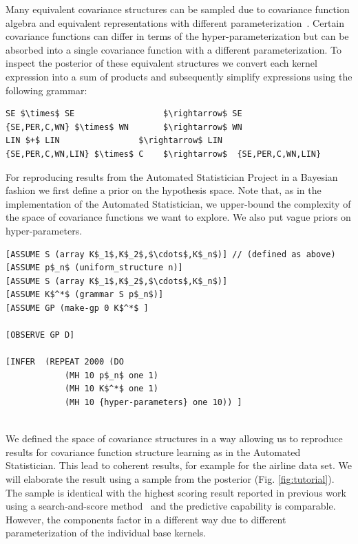 \documentclass{article} %
\begin{document}
Many equivalent covariance structures can be sampled due to covariance function algebra and equivalent representations with different parameterization~\citep{lloyd2014automatic}. Certain covariance functions can differ in terms of the hyper-parameterization but can be absorbed into a single covariance function with a different parameterization. To inspect the posterior of these equivalent structures we convert each kernel expression into a sum of products and subsequently simplify expressions using the following grammar:
\begin{minipage}{\linewidth}

\begin{lstlisting}[frame=single,label=alg:simplify,caption=Grammar to simplify expressions,mathescape]
SE $\times$ SE                  $\rightarrow$ SE 
{SE,PER,C,WN} $\times$ WN       $\rightarrow$ WN
LIN $+$ LIN                $\rightarrow$ LIN
{SE,PER,C,WN,LIN} $\times$ C    $\rightarrow$  {SE,PER,C,WN,LIN} 
\end{lstlisting}

\end{minipage}

For reproducing results from the Automated Statistician Project in a Bayesian fashion we first define a prior on the hypothesis space. Note that, as in the implementation of the Automated Statistician, we upper-bound the complexity of the space of covariance functions we want to explore. We also put vague priors on hyper-parameters.


\begin{minipage}{\linewidth}

\begin{lstlisting}[frame=single,label=alg:structureVent,caption=Venture Code for Bayesian GP Structure Learning,mathescape]
[ASSUME S (array K$_1$,K$_2$,$\cdots$,K$_n$)] // (defined as above)
[ASSUME p$_n$ (uniform_structure n)]
[ASSUME S (array K$_1$,K$_2$,$\cdots$,K$_n$)]
[ASSUME K$^*$ (grammar S p$_n$)]
[ASSUME GP (make-gp 0 K$^*$ ]

[OBSERVE GP D]

[INFER  (REPEAT 2000 (DO 
			(MH 10 p$_n$ one 1) 
			(MH 10 K$^*$ one 1) 
			(MH 10 {hyper-parameters} one 10)) ]


\end{lstlisting}

\end{minipage}

We defined the space of covariance structures in a way allowing us to reproduce results for covariance function structure learning as in the Automated Statistician. This lead to coherent results, for example for the airline data set. We will elaborate the result using a sample from the posterior (Fig. \ref{fig:tutorial}). The sample is identical with the highest scoring result reported in previous work using a search-and-score method~\citep{duvenaud2013structure} and the predictive capability is comparable. However, the components factor in a different way due to different parameterization of the individual base kernels.
\end{document}
